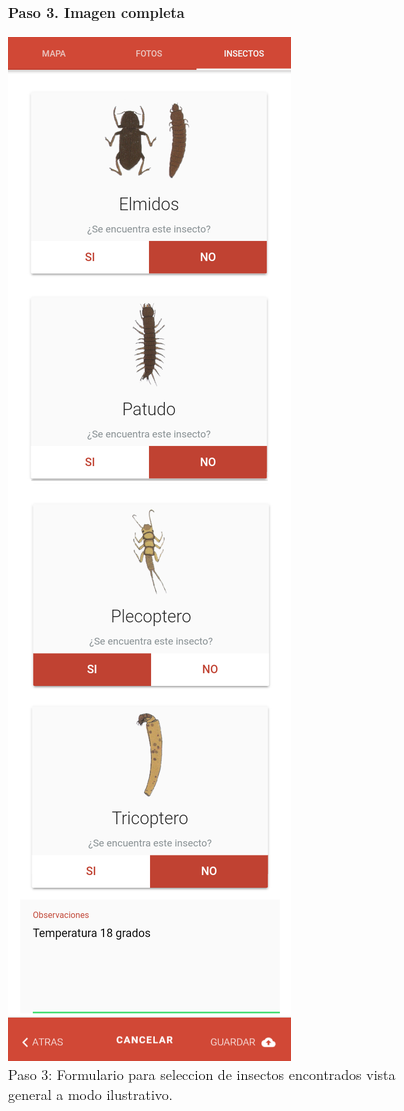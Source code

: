 				\begin{figure}
					\centering
					\textbf{Paso 3. Imagen completa}\par\medskip
					\includegraphics[height=1.2\textwidth]{Screenshots/registroPaso3Completo.png}
					\caption{Paso 3: Formulario para seleccion de insectos encontrados vista general a modo ilustrativo.}
				\end{figure}
				
